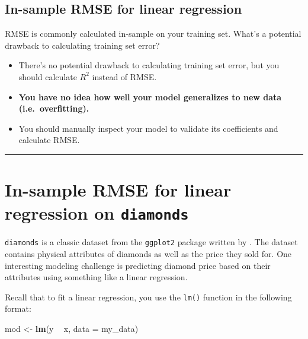 \documentclass[]{book}
\newenvironment{Shaded}{\begin{snugshade}}{\end{snugshade}}
\newcommand{\KeywordTok}[1]{\textcolor[rgb]{0.13,0.29,0.53}{\textbf{#1}}}
\newcommand{\DataTypeTok}[1]{\textcolor[rgb]{0.13,0.29,0.53}{#1}}
\newcommand{\StringTok}[1]{\textcolor[rgb]{0.31,0.60,0.02}{#1}}
\newcommand{\OperatorTok}[1]{\textcolor[rgb]{0.81,0.36,0.00}{\textbf{#1}}}
\newcommand{\NormalTok}[1]{#1}
\begin{document}
\subsection*{In-sample RMSE for linear
regression}\label{in-sample-rmse-for-linear-regression}

RMSE is commonly calculated in-sample on your training set. What's a
potential drawback to calculating training set error?

\begin{itemize}
\item
  There's no potential drawback to calculating training set error, but
  you should calculate \(R^2\) instead of RMSE.
\item
  \textbf{You have no idea how well your model generalizes to new data
  (i.e.~overfitting).}
\item
  You should manually inspect your model to validate its coefficients
  and calculate RMSE.
\end{itemize}

\begin{center}\rule{0.5\linewidth}{\linethickness}\end{center}

\section{\texorpdfstring{In-sample RMSE for linear regression on
\texttt{diamonds}}{In-sample RMSE for linear regression on diamonds}}\label{in-sample-rmse-for-linear-regression-on-diamonds}

\texttt{diamonds} is a classic dataset from the \texttt{ggplot2} package
written by \citet{R-ggplot2}. The dataset contains physical attributes
of diamonds as well as the price they sold for. One interesting modeling
challenge is predicting diamond price based on their attributes using
something like a linear regression.

Recall that to fit a linear regression, you use the \texttt{lm()}
function in the following format:

\begin{Shaded}
\begin{Highlighting}[]
\NormalTok{mod <-}\StringTok{ }\KeywordTok{lm}\NormalTok{(y }\OperatorTok{~}\StringTok{ }\NormalTok{x, }\DataTypeTok{data =}\NormalTok{ my_data)}
\end{Highlighting}
\end{Shaded}
\end{document}
